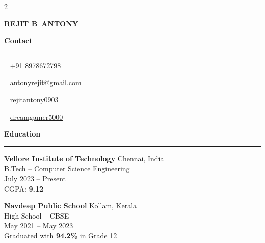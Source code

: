 \documentclass[10pt, a4paper]{article}
\newcommand{\leftsection}[1]{%
  \vspace{8pt}%
  {\color{accent}\large\bfseries #1}\\[-2pt]%
  {\color{accent}\rule{\linewidth}{1pt}}\par\vspace{4pt}%
}
\newcommand{\contactrow}[2]{%
  {\color{accent} #1}~{\footnotesize\color{mwhite} #2}\par\vspace{3pt}%
}
\begin{document}
\pagestyle{empty}
\color{bodytext}

\setlength{\columnsep}{0pt}

\begin{paracol}{2}

\begin{leftcolumn}
\color{mwhite}
\hspace{8pt}\begin{minipage}[t]{\dimexpr\linewidth-16pt}

  \vspace{16pt}
  {\fontsize{17}{21}\selectfont\bfseries\color{mwhite} REJIT B~{\color{accent}ANTONY}}\\[4pt]

  \vspace{-10pt}

  \leftsection{Contact}
  \contactrow{}{+91 8978672798}
  \contactrow{}{\href{mailto:antonyrejit@gmail.com}{antonyrejit@gmail.com}}
  \contactrow{}{\href{https://linkedin.com/in/rejitantony0903}{rejitantony0903}}
  \contactrow{}{\href{https://github.com/dreamgamer5000}{dreamgamer5000}}

  \vspace{10pt}



  \leftsection{Education}

  {\small\bfseries\color{mwhite} Vellore Institute of Technology}\hfill{\footnotesize\color{accentlight} Chennai, India}\\
  {\footnotesize\color{accentlight} B.Tech -- Computer Science Engineering}\\
  {\footnotesize\color{accentlight} July 2023 -- Present}\\
  {\footnotesize\color{accent} CGPA: \textbf{9.12}}

  \vspace{8pt}

  {\small\bfseries\color{mwhite} Navdeep Public School}\hfill{\footnotesize\color{accentlight} Kollam, Kerala}\\
  {\footnotesize\color{accentlight} High School -- CBSE}\\
  {\footnotesize\color{accentlight} May 2021 -- May 2023}\\
  {\footnotesize\color{accent} Graduated with \textbf{94.2\%} in Grade 12}


\end{minipage}
\end{leftcolumn}
\end{paracol}
\end{document}
